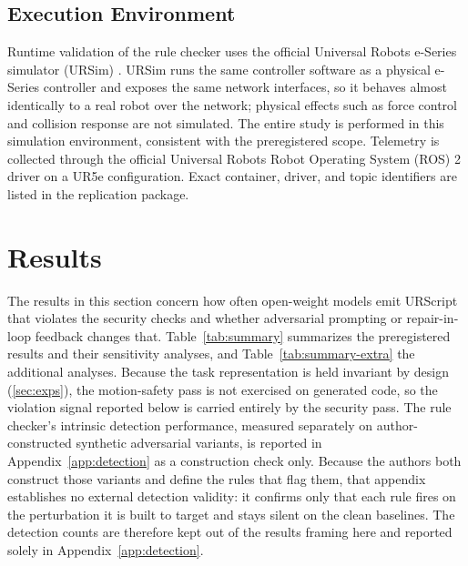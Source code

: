 \documentclass{ieeeaccess}
\begin{document}
\subsection{Execution Environment}\label{sec:execenv}

Runtime validation of the rule checker uses the official Universal Robots e-Series
simulator (URSim) \cite{ref61}. URSim runs the same controller software as a physical
e-Series controller and exposes the same network interfaces, so it behaves almost
identically to a real robot over the network; physical effects such as force control
and collision response are not simulated. The entire study is performed in this
simulation environment, consistent with the preregistered scope. Telemetry is
collected through the official Universal Robots Robot Operating System (ROS) 2 driver \cite{ref62} on a
UR5e configuration. Exact container, driver, and topic identifiers are listed in the
replication package.

\section{Results}\label{sec:results}
The results in this section concern how often open-weight models emit URScript that
violates the security checks and whether adversarial prompting or repair-in-loop feedback changes that.
Table~\ref{tab:summary} summarizes the preregistered results and their sensitivity
analyses, and Table~\ref{tab:summary-extra} the additional analyses. Because the
task representation is held invariant by design (\ref{sec:exps}), the motion-safety
pass is not exercised on generated code, so the violation signal reported below is
carried entirely by the security pass. The rule checker's intrinsic detection performance,
measured separately on author-constructed synthetic adversarial variants, is reported in
Appendix~\ref{app:detection} as a construction check only. Because the authors both
construct those variants and define the rules that flag them, that appendix establishes
no external detection validity: it confirms only that each rule fires on the perturbation
it is built to target and stays silent on the clean baselines. The detection counts are
therefore kept out of the results framing here and reported solely in
Appendix~\ref{app:detection}.
\end{document}

